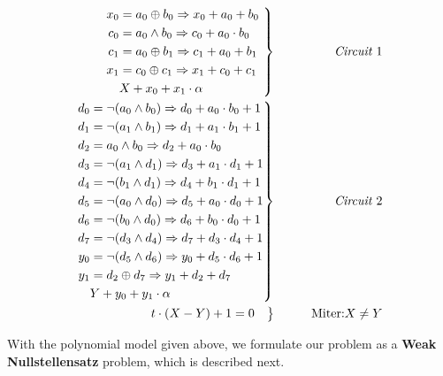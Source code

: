 \begin{Example}
\begin{eqnarray}[htb]
 \left .  \begin{aligned}
	x_0&=a_0 \oplus b_0  \Rightarrow x_0+a_0 + b_0 \\
	c_0&=a_0\wedge b_0   \Rightarrow c_0+a_0 \cdot b_0\\
	c_1&=a_0\oplus b_1   \Rightarrow c_1+a_0 + b_1 \\
	x_{1}&=c_{0}\oplus c_{1}  \Rightarrow x_{1}+c_{0}+ c_{1} \\
	&X+x_{0}+x_{1}\cdot \alpha				\\
	 \end{aligned} 
\ \right\}
 &\qquad&  \text{\it Circuit $1$} \nonumber \\
 \left . \begin{aligned}
d_{0}&=\neg (a_{0} \wedge b_{0}) \Rightarrow d_{0}+ a_{0} \cdot b_{0}+1  \\
	d_{1}&=\neg (a_{1} \wedge b_{1}) \Rightarrow d_{1}+ a_{1} \cdot b_{1}+1  \\
	d_{2}&= a_{0} \wedge b_{0} \Rightarrow d_{2}+ a_{0}\cdot b_{0} \\
	d_{3}&=\neg (a_{1} \wedge d_{1}) \Rightarrow d_{3}+ a_{1} \cdot d_{1}+1  \\
	d_{4}&=\neg (b_{1} \wedge d_{1}) \Rightarrow d_{4}+ b_{1} \cdot d_{1}+1  \\
	d_{5}&=\neg (a_{0} \wedge d_{0}) \Rightarrow d_{5}+ a_{0} \cdot d_{0}+1  \\
	d_{6}&=\neg (b_{0} \wedge d_{0}) \Rightarrow d_{6}+ b_{0} \cdot d_{0}+1  \\
	d_{7}&=\neg (d_{3} \wedge d_{4}) \Rightarrow d_{7}+ d_{3} \cdot d_{4}+1  \\ 
	y_{0}&=\neg (d_{5} \wedge d_{6}) \Rightarrow y_{0}+ d_{5} \cdot d_{6}+1  \\
	y_{1}&=d_{2} \oplus d_{7}   \Rightarrow  y_{1}+d_{2} + d_{7}	\\
	&Y+y_{0}+y_{1}\cdot \alpha				\\
 \end{aligned} 
\right\}
 &\qquad&  \text{\it  Circuit $2$} \nonumber \\
 \left .  \begin{aligned}
	&t\cdot (X-Y)+1=0 				
 \end{aligned} 
\right\}
 &\qquad& \text{Miter:}X \neq Y
\end{eqnarray}

\end{Example}


With the polynomial model given above, we formulate our problem as a {\bf Weak Nullstellensatz} problem, 
which is described next.

